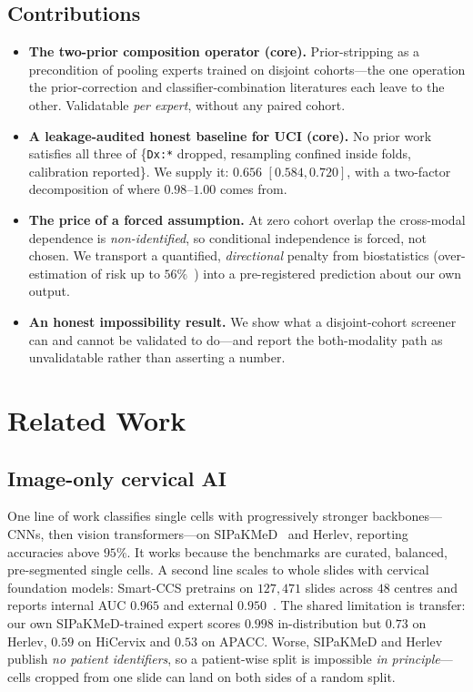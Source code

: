 \documentclass[sigplan,nonacm,screen]{acmart}
\begin{document}
\subsection{Contributions}
\begin{itemize}
  \item \textbf{The two-prior composition operator (core).} Prior-stripping as a precondition of pooling experts trained on disjoint cohorts---the one operation the prior-correction and classifier-combination literatures each leave to the other. Validatable \emph{per expert}, without any paired cohort.
  \item \textbf{A leakage-audited honest baseline for UCI (core).} No prior work satisfies all three of \{\texttt{Dx:*} dropped, resampling confined inside folds, calibration reported\}. We supply it: $0.656$ $[0.584,0.720]$, with a two-factor decomposition of where $0.98$--$1.00$ comes from.
  \item \textbf{The price of a forced assumption.} At zero cohort overlap the cross-modal dependence is \emph{non-identified}, so conditional independence is forced, not chosen. We transport a quantified, \emph{directional} penalty from biostatistics (over-estimation of risk up to $56\%$~\cite{grill2017comparison}) into a pre-registered prediction about our own output.
  \item \textbf{An honest impossibility result.} We show what a disjoint-cohort screener can and cannot be validated to do---and report the both-modality path as unvalidatable rather than asserting a number.
\end{itemize}

\section{Related Work}

\subsection{Image-only cervical AI}
One line of work classifies single cells with progressively stronger backbones---CNNs, then vision transformers---on SIPaKMeD~\cite{plissiti2018sipakmed} and Herlev, reporting accuracies above $95\%$. It works because the benchmarks are curated, balanced, pre-segmented single cells. A second line scales to whole slides with cervical foundation models: Smart-CCS pretrains on $127{,}471$ slides across $48$ centres and reports internal AUC $0.965$ and external $0.950$~\cite{zhang2025smartccs}. The shared limitation is transfer: our own SIPaKMeD-trained expert scores $0.998$ in-distribution but $0.73$ on Herlev, $0.59$ on HiCervix and $0.53$ on APACC. Worse, SIPaKMeD and Herlev publish \emph{no patient identifiers}, so a patient-wise split is impossible \emph{in principle}---cells cropped from one slide can land on both sides of a random split.
\end{document}

